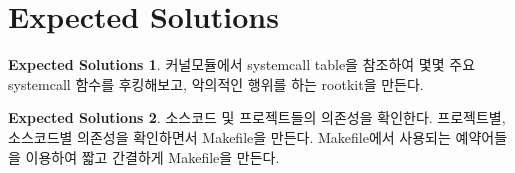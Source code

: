 \documentclass[a4paper, 11pt]{article}
\theoremstyle{definition}
\newtheorem{solution}{Expected Solutions}
\begin{document}
\section{Expected Solutions}

\begin{solution}

  커널모듈에서 systemcall table을 참조하여 몇몇 주요 systemcall 함수를 후킹해보고, 악의적인 행위를 하는 rootkit을 만든다.

\end{solution}

\begin{solution}

  소스코드 및 프로젝트들의 의존성을 확인한다. 프로젝트별, 소스코드별 의존성을 확인하면서 Makefile을 만든다. Makefile에서 사용되는 예약어들을 이용하여 짧고 간결하게 Makefile을 만든다.

\end{solution}



\end{document}
